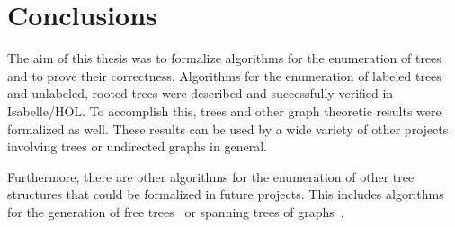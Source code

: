 \chapter{Conclusions}\label{chapter:conclusions}

The aim of this thesis was to formalize algorithms for the enumeration of trees and to prove their correctness.
Algorithms for the enumeration of labeled trees and unlabeled, rooted trees were described and successfully verified in Isabelle/HOL.
To accomplish this, trees and other graph theoretic results were formalized as well.
These results can be used by a wide variety of other projects involving trees or undirected graphs in general.

Furthermore, there are other algorithms for the enumeration of other tree structures that could be formalized in future projects.
This includes algorithms for the generation of free trees~\cite{Wright1986ConstantTG} or spanning trees of graphs~\cite{SpanningTreeEnumetaion}.

